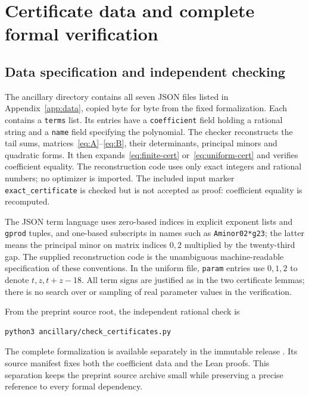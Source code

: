 \documentclass[11pt]{article}
\theoremstyle{remark}\newtheorem{remark}[theorem]{Remark}
\begin{document}
\section{Certificate data and complete formal verification}\label{sec:verification}
\subsection{Data specification and independent checking}
The ancillary directory contains all seven JSON files listed in Appendix~\ref{app:data}, copied byte for byte from the fixed formalization. Each contains a \texttt{terms} list. Its entries have a \texttt{coefficient} field holding a rational string and a \texttt{name} field specifying the polynomial. The checker reconstructs the tail sums, matrices~\eqref{eq:A}--\eqref{eq:B}, their determinants, principal minors and quadratic forms. It then expands~\eqref{eq:finite-cert} or~\eqref{eq:uniform-cert} and verifies coefficient equality. The reconstruction code uses only exact integers and rational numbers; no optimizer is imported. The included input marker \texttt{exact\_certificate} is checked but is not accepted as proof: coefficient equality is recomputed.

The JSON term language uses zero-based indices in explicit exponent lists and \texttt{gprod} tuples, and one-based subscripts in names such as \texttt{Aminor02*g23}; the latter means the principal minor on matrix indices $0,2$ multiplied by the twenty-third gap. The supplied reconstruction code is the unambiguous machine-readable specification of these conventions. In the uniform file, \texttt{param} entries use $0,1,2$ to denote $t,z,t+z-18$. All term signs are justified as in the two certificate lemmas; there is no search over or sampling of real parameter values in the verification.

From the preprint source root, the independent rational check is
\begin{verbatim}
python3 ancillary/check_certificates.py
\end{verbatim}
The complete formalization is available separately in the immutable release \cite{ProofRelease}. Its source manifest fixes both the coefficient data and the Lean proofs. This separation keeps the preprint source archive small while preserving a precise reference to every formal dependency.
\end{document}
